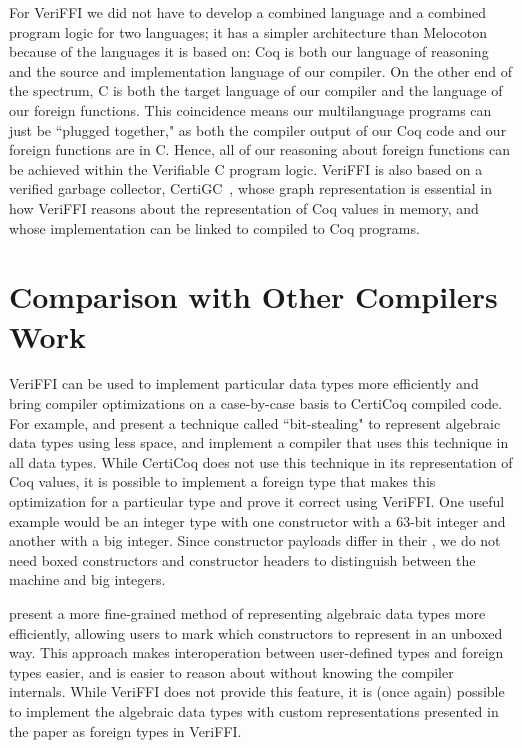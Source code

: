 For VeriFFI we did not have to develop a combined language and a combined program logic for two languages; it has a simpler architecture than Melocoton because of the languages it is based on:
Coq is both our language of reasoning and the source and implementation language of our compiler. On the other end of the spectrum, C is both the target language of our compiler and the language of our foreign functions. This coincidence means our multilanguage programs can just be ``plugged together," as both the compiler output of our Coq code and our foreign functions are in C. Hence, all of our reasoning about foreign functions can be achieved within the Verifiable C program logic.
VeriFFI is also based on a verified garbage collector, CertiGC~\cite{wang2019graph}, whose  graph representation is essential in how VeriFFI reasons about the representation of Coq values in memory, and whose implementation can be linked to compiled to Coq programs.


\section{Comparison with Other Compilers Work}

VeriFFI can be used to implement particular data types more efficiently and bring compiler optimizations on a case-by-case basis to CertiCoq compiled code.
For example,  and  present a technique called ``bit-stealing" to represent algebraic data types using less space, and implement a compiler that uses this technique in all data types. 
While CertiCoq does not use this technique in its representation of Coq values,
it is possible to implement a foreign type that makes this optimization for a particular type and prove it correct using VeriFFI.
One useful example would be an integer type with one constructor with a 63-bit integer and another with a big integer.
Since constructor payloads differ in their , we do not need boxed constructors and constructor headers to distinguish between the machine and big integers.

 present a more fine-grained method of representing algebraic data types more efficiently, allowing users to mark which constructors to represent in an \gls{unboxed} way. This approach makes interoperation between user-defined types and \gls{foreign type}s easier, and is easier to reason about without knowing the compiler internals. While VeriFFI does not provide this feature, it is (once again) possible to implement the algebraic data types with custom representations presented in the paper as \gls{foreign type}s in VeriFFI.

